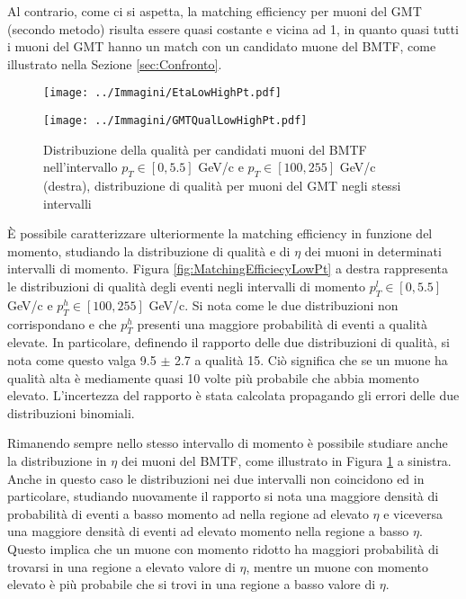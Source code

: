 Al contrario, come ci si aspetta, la matching efficiency per muoni del GMT (secondo metodo) risulta essere quasi costante e vicina ad 1, in quanto quasi tutti i muoni del GMT hanno un match con un candidato muone del BMTF, come illustrato nella Sezione \ref{sec:Confronto}. 


\begin{figure}[t]
  \centering
  \begin{minipage}[b]{0.45\textwidth}
    \centering
    \texttt{[image: ../Immagini/EtaLowHighPt.pdf]} 
    \end{minipage}
    \hfill 
    \begin{minipage}[b]{0.45\textwidth}
      \centering
      \texttt{[image: ../Immagini/GMTQualLowHighPt.pdf]} 
    \end{minipage}
    \caption{Distribuzione della qualità per candidati muoni del BMTF nell'intervallo $p_T \in [0, 5.5]$ GeV/c e $p_T \in [100, 255]$ GeV/c (destra), distribuzione di qualità per muoni del GMT negli stessi intervalli}
  \label{fig:QualEtaLowHighPt}
\end{figure}

È possibile caratterizzare ulteriormente la matching efficiency in funzione del momento, studiando la distribuzione di qualità e di $\eta$ dei muoni in determinati intervalli di momento. Figura \ref{fig:MatchingEfficiecyLowPt} a destra rappresenta le distribuzioni di qualità degli eventi negli intervalli di momento $p_T^l \in [0, 5.5]$ GeV/c e $p_T^h \in [100, 255]$ GeV/c. Si nota come le due distribuzioni non corrispondano e che $p_T^h$ presenti una maggiore probabilità di eventi a qualità elevate. In particolare, definendo il rapporto delle due distribuzioni di qualità, si nota come questo valga 9.5 $\pm$ 2.7 a qualità 15. Ciò significa che se un muone ha qualità alta è mediamente quasi 10 volte più probabile che abbia momento elevato. L'incertezza del rapporto è stata calcolata propagando gli errori delle due distribuzioni binomiali.

Rimanendo sempre nello stesso intervallo di momento è possibile studiare anche la distribuzione in $\eta$ dei muoni del BMTF, come illustrato in Figura \ref{fig:QualEtaLowHighPt} a sinistra. Anche in questo caso le distribuzioni nei due intervalli non coincidono ed in particolare, studiando nuovamente il rapporto si nota una maggiore densità di probabilità di eventi a basso momento ad nella regione ad elevato $\eta$ e viceversa una maggiore densità di eventi ad elevato momento nella regione a basso $\eta$. \newline
Questo implica che un muone con momento ridotto ha maggiori probabilità di trovarsi in una regione a elevato valore di $\eta$, mentre un muone con momento elevato è più probabile che si trovi in una regione a basso valore di $\eta$.


